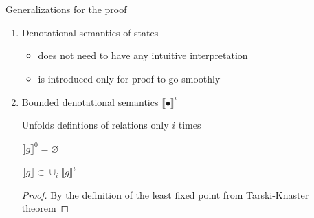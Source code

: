\documentclass{beamer}
\let\emptyset\varnothing
\newcommand{\sembr}[1]{\llbracket{#1}\rrbracket}
\theoremstyle{definition}
\theoremstyle{plain} %
\begin{document}
\begin{frame}{Generalizations for the proof}

\begin{enumerate}

\item Denotational semantics of states

\begin{itemize}

\item does not need to have any intuitive interpretation

\item is introduced only for proof to go smoothly

\end{itemize}

\item Bounded denotational semantics $\sembr{\bullet}^i$

\vskip3mm

Unfolds defintions of relations only $i$ times

\vskip3mm

$\sembr{g}^0 = \emptyset$

\begin{lemma}
$\sembr{g} \subset \cup_i \sembr{g}^i$
\end{lemma}
\begin{proof}
By the definition of the least fixed point from Tarski-Knaster theorem
\end{proof}


\end{enumerate}

\end{frame}
\end{document}
